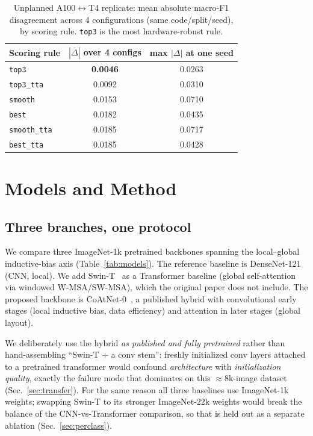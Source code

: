 \documentclass[11pt,a4paper]{article}
\newcommand{\macroF}{\textup{macro-F1}}   %
\begin{document}
\begin{table}[t]
\centering
\caption{Unplanned A100$\leftrightarrow$T4 replicate: mean absolute
\macroF{} disagreement across 4 configurations (same code/split/seed), by
scoring rule. \texttt{top3} is the most hardware-robust rule.}
\label{tab:hw}
\begin{tabular}{lcc}
\toprule
Scoring rule & $|\overline{\Delta}|$ over 4 configs & max $|\Delta|$ at one seed \\
\midrule
\texttt{top3}       & \textbf{0.0046} & 0.0263 \\
\texttt{top3\_tta}  & 0.0092 & 0.0310 \\
\texttt{smooth}     & 0.0153 & 0.0710 \\
\texttt{best}       & 0.0182 & 0.0435 \\
\texttt{smooth\_tta}& 0.0185 & 0.0717 \\
\texttt{best\_tta}  & 0.0185 & 0.0428 \\
\bottomrule
\end{tabular}
\end{table}

\section{Models and Method}
\label{sec:methods}

\subsection{Three branches, one protocol}
We compare three ImageNet-1k pretrained backbones spanning the local--global
inductive-bias axis (Table~\ref{tab:models}). The reference baseline is
DenseNet-121 (CNN, local). We add Swin-T~\cite{swin} as a Transformer baseline
(global self-attention via windowed W-MSA/SW-MSA), which the original paper does
not include. The proposed backbone is CoAtNet-0~\cite{coatnet}, a published
hybrid with convolutional early stages (local inductive bias, data efficiency)
and attention in later stages (global layout).

We deliberately use the hybrid \emph{as published and fully pretrained} rather
than hand-assembling ``Swin-T + a conv stem'': freshly initialized conv layers
attached to a pretrained transformer would confound \emph{architecture} with
\emph{initialization quality}, exactly the failure mode that dominates on this
$\approx$8k-image dataset (Sec.~\ref{sec:transfer}). For the same reason all
three baselines use ImageNet-1k weights; swapping Swin-T to its stronger
ImageNet-22k weights would break the balance of the CNN-vs-Transformer
comparison, so that is held out as a separate ablation (Sec.~\ref{sec:perclass}).
\end{document}
